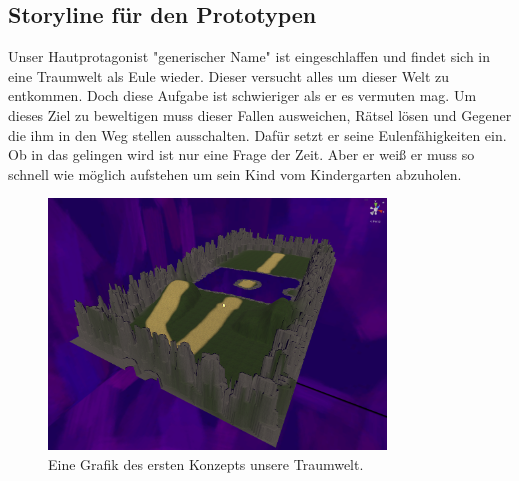\subsection{Storyline für den Prototypen}
Unser Hautprotagonist "generischer Name" ist eingeschlaffen und findet sich in eine Traumwelt als Eule wieder. Dieser versucht alles um dieser Welt zu entkommen. Doch diese Aufgabe ist schwieriger als er es vermuten mag. Um dieses Ziel zu beweltigen muss dieser Fallen ausweichen, Rätsel lösen und Gegener die ihm in den Weg stellen ausschalten. Dafür setzt er seine Eulenfähigkeiten ein. Ob in das gelingen wird ist nur eine Frage der Zeit. Aber er weiß er muss so schnell wie möglich aufstehen um sein Kind vom Kindergarten abzuholen. %

\begin{figure}[H]
    \centering
    \includegraphics[width=0.8\textwidth]{chapters/15/images/Dreamworld.png}
    \caption{Eine Grafik des ersten Konzepts unsere Traumwelt.}
    \label{UST-7}
\end{figure}

